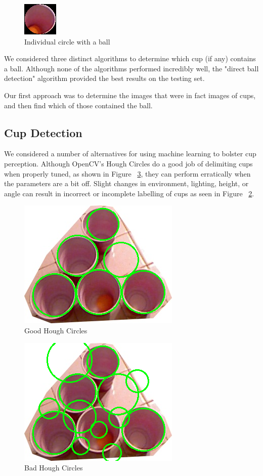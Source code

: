 \documentclass[letterpaper, 10 pt, conference]{ieeeconf}  %
\begin{document}
\begin{figure}[thpb]
      \centering
	  \includegraphics[scale =1]{single1}
      \caption{Individual circle with a ball}
      \label{fig:ball}
\end{figure}

We considered three distinct algorithms to determine which cup (if any) contains a ball.  Although none of the algorithms performed incredibly well, the "direct ball detection" algorithm provided the best results on the testing set.

Our first approach was to determine the images that were in fact images of cups, and then find which of those contained the ball. 

\subsection{Cup Detection}

We considered a number of alternatives for using machine learning to bolster cup perception.  Although OpenCV’s Hough Circles do a good job of delimiting cups when properly tuned, as shown in Figure ~\ref{fig:bad}, they can perform erratically when the parameters are a bit off.  Slight changes in environment, lighting, height, or angle can result in incorrect or incomplete labelling of cups as seen in Figure ~\ref{fig:good}.

\begin{figure}[thpb]
      \centering
	  \includegraphics[scale =0.5]{good}
      \caption{Good Hough Circles}
      \label{fig:good}
\end{figure}

\begin{figure}[thpb]
      \centering
	  \includegraphics[scale =0.5]{bad}
      \caption{Bad Hough Circles}
      \label{fig:bad}
\end{figure}
\end{document}
